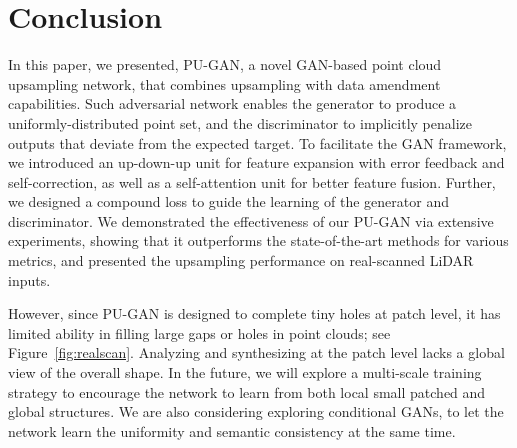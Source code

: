 \section{Conclusion}
\label{sec:conclusion}

In this paper, we presented, PU-GAN, a novel GAN-based point cloud upsampling network,  that combines upsampling with data amendment capabilities.
Such adversarial network enables the generator to produce a uniformly-distributed point set, and  the discriminator to implicitly penalize outputs that deviate from the expected target.
To facilitate the GAN framework, we introduced an up-down-up unit for feature expansion with error feedback and self-correction, as well as a self-attention unit for better feature fusion.
Further, we designed a compound loss to guide the learning of the generator and discriminator. We demonstrated the effectiveness of our PU-GAN via extensive experiments, showing that it outperforms the state-of-the-art methods for various metrics, and presented the upsampling performance on real-scanned LiDAR inputs.

However, since PU-GAN is designed to complete tiny holes at patch level, it has limited ability in filling large gaps or holes in point clouds; see Figure~\ref{fig:realscan}. Analyzing and synthesizing at the patch level lacks a global view of the overall shape.
In the future, we will explore a multi-scale training strategy to encourage the network to learn from both local small patched and global structures.
We are also considering exploring conditional GANs, to let the network learn the uniformity and semantic consistency at the same time.


